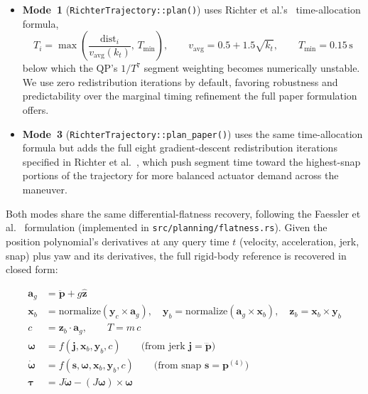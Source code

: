 \documentclass[11pt,a4paper]{article}
\newcommand{\code}[1]{\texttt{#1}}
\begin{document}
\begin{itemize}
  \item \textbf{Mode~1} (\code{RichterTrajectory::plan()}) uses Richter et al.'s~\cite{richter2016}
    time-allocation formula,
    \[
      T_i = \max\!\left(\frac{\mathrm{dist}_i}{v_{\mathrm{avg}}(k_t)},\, T_{\min}\right),
      \qquad v_{\mathrm{avg}} = 0.5 + 1.5\sqrt{k_t}, \qquad T_{\min}=0.15\,\mathrm{s}
    \]
    below which the QP's $1/T^7$ segment weighting becomes numerically unstable. We use zero
    redistribution iterations by default, favoring robustness and predictability over the
    marginal timing refinement the full paper formulation offers.
  \item \textbf{Mode~3} (\code{RichterTrajectory::plan\_paper()}) uses the same time-allocation
    formula but adds the full eight gradient-descent redistribution iterations specified in
    Richter et al.~\cite{richter2016}, which push segment time toward the highest-snap portions
    of the trajectory for more balanced actuator demand across the maneuver.
\end{itemize}

Both modes share the same differential-flatness recovery, following the Faessler et
al.~\cite{faessler2018} formulation (implemented in \code{src/planning/flatness.rs}). Given the
position polynomial's derivatives at any query time $t$ (velocity, acceleration, jerk, snap) plus
yaw and its derivatives, the full rigid-body reference is recovered in closed form:

\begin{align}
  \mathbf{a}_g &= \ddot{\mathbf{p}} + g\hat{\mathbf{z}} \\
  \mathbf{x}_b &= \mathrm{normalize}(\mathbf{y}_c \times \mathbf{a}_g), \quad
  \mathbf{y}_b = \mathrm{normalize}(\mathbf{a}_g \times \mathbf{x}_b), \quad
  \mathbf{z}_b = \mathbf{x}_b \times \mathbf{y}_b \\
  c &= \mathbf{z}_b \cdot \mathbf{a}_g, \qquad T = m\,c \\
  \boldsymbol{\omega} &= f(\mathbf{j}, \mathbf{x}_b, \mathbf{y}_b, c)
    \qquad \text{(from jerk } \mathbf{j}=\dddot{\mathbf{p}}\text{)} \\
  \dot{\boldsymbol{\omega}} &= f(\mathbf{s}, \boldsymbol{\omega}, \mathbf{x}_b, \mathbf{y}_b, c)
    \qquad \text{(from snap } \mathbf{s}=\mathbf{p}^{(4)}\text{)} \\
  \boldsymbol{\tau} &= J\dot{\boldsymbol{\omega}} - (J\boldsymbol{\omega})\times\boldsymbol{\omega}
\end{align}
\end{document}
